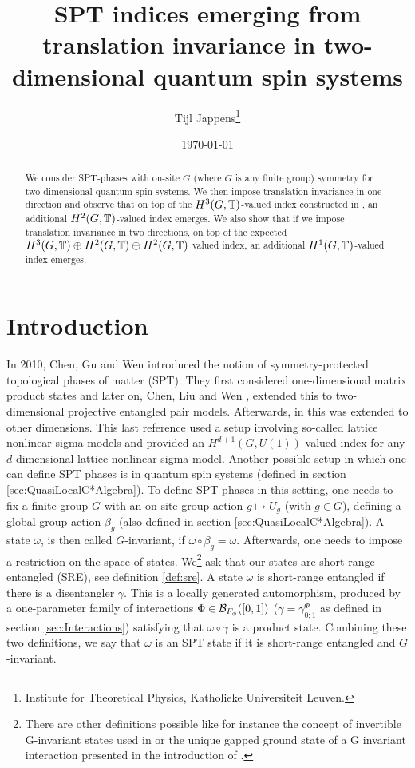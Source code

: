 \documentclass[11pt,a4paper,twoside]{article}
\title{SPT indices emerging from translation invariance in two-dimensional quantum spin systems}
\author{Tijl Jappens\footnote{Institute for Theoretical Physics, Katholieke Universiteit Leuven.}}
\date{\today}
\numberwithin{equation}{section}
\begin{document}
	\maketitle 
	\begin{abstract}
		We consider SPT-phases with on-site $G$ (where $G$ is any finite group) symmetry for two-dimensional quantum spin systems. We then impose translation invariance in one direction and observe that on top of the $H^3(G,\mathbb T)$-valued index constructed in \cite{ogata2021h3gmathbb}, an additional $H^2(G,\mathbb T)$-valued index emerges. We also show that if we impose translation invariance in two directions, on top of the expected $H^3(G,\mathbb T)\oplus H^2(G,\mathbb T)\oplus H^2(G,\mathbb T)$ valued index, an additional $H^1(G,\mathbb T)$-valued index emerges.
	\end{abstract}
	\section{Introduction}
	In 2010, Chen, Gu and Wen \cite{chen_gu_wen_2011} introduced the notion of symmetry-protected topological phases of matter (SPT). They first considered one-dimensional matrix product states and later on, Chen, Liu and Wen \cite{Chen_2011}, extended this to two-dimensional projective entangled pair models. Afterwards, in \cite{Chen_2013} this was extended to other dimensions. This last reference used a setup involving so-called lattice nonlinear sigma models and provided an $H^{d+1}(G,U(1))$ valued index for any $d$-dimensional lattice nonlinear sigma model. Another possible setup in which one can define SPT phases is in quantum spin systems (defined in section \ref{sec:QuasiLocalC*Algebra}). To define SPT phases in this setting, one needs to fix a finite group $G$ with an on-site group action $g\mapsto U_g$ (with $g\in G$), defining a global group action $\beta_g$ (also defined in section \ref{sec:QuasiLocalC*Algebra}). A state $\omega$, is then called $G$-invariant, if $\omega\circ\beta_g=\omega$. Afterwards, one needs to impose a restriction on the space of states. We\footnote{There are other definitions possible like for instance the concept of invertible G-invariant states used in \cite{kapustin2021classification} or the unique gapped ground state of a G invariant interaction presented in the introduction of \cite{ogata2021h3gmathbb}.} ask that our states are short-range entangled (SRE), see definition \ref{def:sre}. A state $\omega$ is short-range entangled if there is a disentangler $\gamma$. This is a locally generated automorphism, produced by a one-parameter family of interactions $\Phi\in\mathcal B_{F_\phi}([0,1])$ ($\gamma=\gamma_{0;1}^\Phi$ as defined in section \ref{sec:Interactions}) satisfying that $\omega\circ\gamma$ is a product state. Combining these two definitions, we say that $\omega$ is an SPT state if it is short-range entangled and $G$-invariant.
\end{document}
